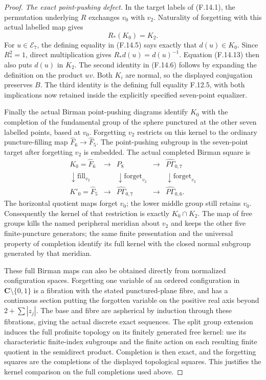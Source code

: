 \begin{proof}
\emph{The exact point-pushing defect.}
In the target labels of (F.14.1), the permutation
underlying $R$ exchanges $v_0$ with $v_2$.
Naturality of forgetting with this actual
labelled map gives
\[
                    R_*(K_0)=K_2.                            \tag{F.14.13}
\]
For $u\in\mathcal E_7$, the defining equality in
(F.14.5) says exactly that $d(u)\in K_0$.
Since $R_*^2=1$, direct multiplication gives
$R_*d(u)=d(u)^{-1}$.
Equation (F.14.13) then also puts $d(u)$ in
$K_2$.  The second identity in (F.14.6) follows
by expanding the definition on the product $uv$.
Both $K_i$ are normal, so the displayed conjugation
preserves $B$.  The third identity is the defining
full equality F.12.5, with both implications now
retained inside the explicitly specified
seven-point equalizer.

Finally the actual Birman point-pushing diagrams
identify $K_0$ with the completion of the
fundamental group of the sphere punctured at
the other seven labelled points, based at
$v_0$.  Forgetting $v_2$ restricts on this kernel
to the ordinary puncture-filling map
$\widehat F_6\to\widehat F_5$.
The point-pushing subgroup in the seven-point
target after forgetting $v_2$ is embedded.  The
actual completed Birman square is
\[
\begin{array}{ccccc}
 K_0=\widehat F_6&\longrightarrow&P_8
    &\longrightarrow&\widehat{P\Gamma}_{0,7}\\
 \downarrow\mathrm{fill}_{v_2}
    &&\downarrow\mathrm{forget}_{v_2}
    &&\downarrow\mathrm{forget}_{v_2}\\
 K'_0=\widehat F_5&\longrightarrow&
       \widehat{P\Gamma}_{0,7}
    &\longrightarrow&\widehat{P\Gamma}_{0,6}.
\end{array}                                                     \tag{F.14.14}
\]
The horizontal quotient maps forget $v_0$;
the lower middle group still retains $v_0$.
Consequently the kernel of that
restriction is exactly $K_0\cap K_2$.
The map of free groups kills the named peripheral
meridian about $v_2$ and keeps the other five
finite-puncture generators; the same finite
presentation and the universal property of
completion identify its full kernel with the
closed normal subgroup generated by that
meridian.

These full Birman maps can also be obtained
directly from normalized configuration spaces.
Forgetting one variable of an ordered configuration
in $\mathbf C\setminus\{0,1\}$ is a fibration
with the stated punctured-plane fibre, and has
a continuous section putting the forgotten
variable on the positive real axis beyond
$2+\sum|z_j|$.
The base and fibre are aspherical by induction
through these fibrations, giving the actual
discrete exact sequences.
The split group extension induces the full
profinite topology on its finitely generated
free kernel: use its characteristic finite-index
subgroups and the finite action on each resulting
finite quotient in the semidirect product.
Completion is then exact, and the forgetting
squares are the completions of the displayed
topological squares.
This justifies the kernel comparison on the
full completions used above.


\end{proof}
